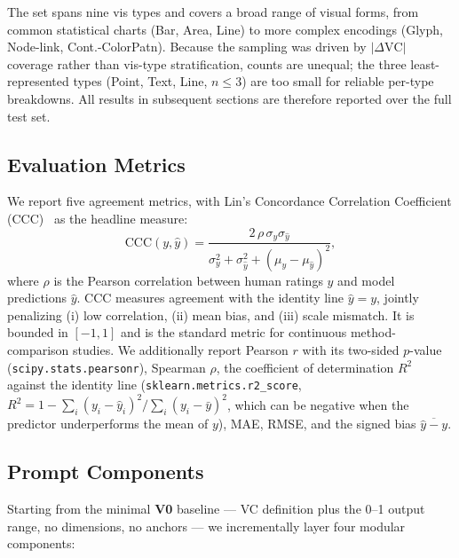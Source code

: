 The set spans nine vis types and covers a broad range of visual forms,
from common statistical charts (Bar, Area, Line) to more complex
encodings (Glyph, Node-link, Cont.-ColorPatn). Because the sampling
was driven by $|\Delta \mathrm{VC}|$ coverage rather than vis-type
stratification, counts are unequal; the three least-represented types
(Point, Text, Line, $n \le 3$) are too small for reliable per-type
breakdowns. All results in subsequent sections are therefore reported
over the full test set.

\subsection{Evaluation Metrics}
\label{app:vc-metrics}

We report five agreement metrics, with Lin's Concordance Correlation
Coefficient (CCC)~\cite{lin1989ccc} as the headline measure:
\begin{equation}
\mathrm{CCC}(y, \hat{y}) =
\frac{2\,\rho\,\sigma_y\sigma_{\hat{y}}}
     {\sigma_y^2 + \sigma_{\hat{y}}^2 + (\mu_y - \mu_{\hat{y}})^2},
\end{equation}
where $\rho$ is the Pearson correlation between human ratings $y$ and model
predictions $\hat{y}$. CCC measures agreement with the identity line
$\hat{y} = y$, jointly penalizing (i) low correlation, (ii) mean bias, and
(iii) scale mismatch. It is bounded in $[-1, 1]$ and is the standard metric
for continuous method-comparison studies. We additionally report Pearson
$r$ with its two-sided $p$-value (\texttt{scipy.stats.pearsonr}), Spearman
$\rho$, the coefficient of determination $R^2$ against the identity line
(\texttt{sklearn.metrics.r2\_score},
$R^2 = 1 - \sum_i (y_i - \hat{y}_i)^2 / \sum_i (y_i - \bar{y})^2$, which
can be negative when the predictor underperforms the mean of $y$), MAE,
RMSE, and the signed bias $\overline{\hat{y} - y}$.

\subsection{Prompt Components}
\label{app:vc-components}

Starting from the minimal \textbf{V0} baseline --- VC definition plus the
0--1 output range, no dimensions, no anchors --- we incrementally layer
four modular components:

